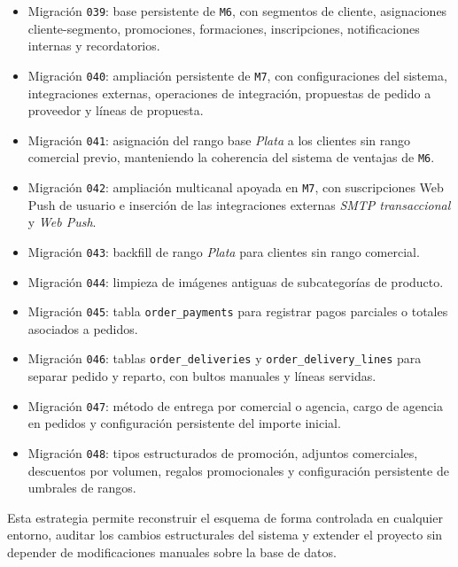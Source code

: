 \begin{itemize}
    \item Migración \texttt{039}: base persistente de \texttt{M6}, con segmentos de cliente, asignaciones cliente-segmento, promociones, formaciones, inscripciones, notificaciones internas y recordatorios.
    \item Migración \texttt{040}: ampliación persistente de \texttt{M7}, con configuraciones del sistema, integraciones externas, operaciones de integración, propuestas de pedido a proveedor y líneas de propuesta.
    \item Migración \texttt{041}: asignación del rango base \textit{Plata} a los clientes sin rango comercial previo, manteniendo la coherencia del sistema de ventajas de \texttt{M6}.
    \item Migración \texttt{042}: ampliación multicanal apoyada en \texttt{M7}, con suscripciones Web Push de usuario e inserción de las integraciones externas \textit{SMTP transaccional} y \textit{Web Push}.
    \item Migración \texttt{043}: backfill de rango \textit{Plata} para clientes sin rango comercial.
    \item Migración \texttt{044}: limpieza de imágenes antiguas de subcategorías de producto.
    \item Migración \texttt{045}: tabla \texttt{order\_payments} para registrar pagos parciales o totales asociados a pedidos.
    \item Migración \texttt{046}: tablas \texttt{order\_deliveries} y \texttt{order\_delivery\_lines} para separar pedido y reparto, con bultos manuales y líneas servidas.
    \item Migración \texttt{047}: método de entrega por comercial o agencia, cargo de agencia en pedidos y configuración persistente del importe inicial.
    \item Migración \texttt{048}: tipos estructurados de promoción, adjuntos comerciales, descuentos por volumen, regalos promocionales y configuración persistente de umbrales de rangos.
\end{itemize}

Esta estrategia permite reconstruir el esquema de forma controlada en cualquier entorno, auditar los cambios estructurales del sistema y extender el proyecto sin depender de modificaciones manuales sobre la base de datos.
